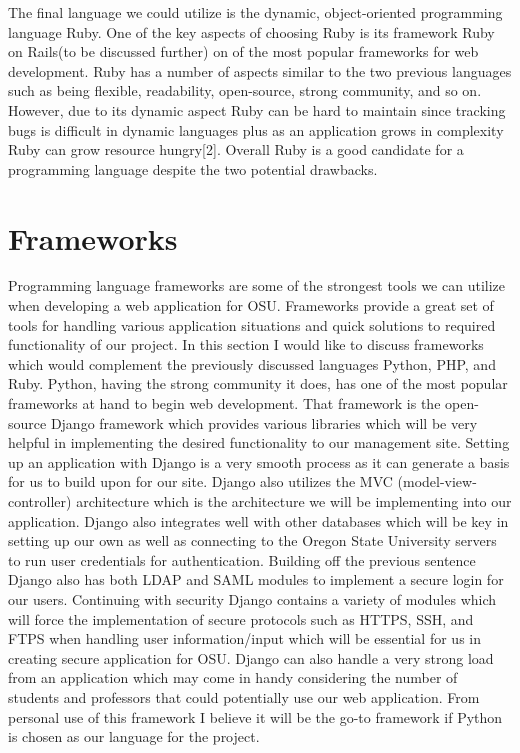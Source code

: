 \documentclass[letterpaper, 10pt, draftclsnofoot,onecolumn]{IEEEtran}
\begin{document}
The final language we could utilize is the dynamic, object-oriented programming language Ruby. One of the key aspects of choosing Ruby is its framework Ruby on Rails(to be discussed further) on of the most popular frameworks for  web development. Ruby has a number of aspects similar to the two previous languages such as being flexible, readability, open-source, strong community, and so on. However, due to its dynamic aspect Ruby can be hard to maintain since tracking bugs is difficult in dynamic languages plus as an application grows in complexity Ruby can grow resource hungry[2]. Overall Ruby is a good candidate for a programming language despite the two potential drawbacks. 

\section{Frameworks}
Programming language frameworks are some of the strongest tools we can utilize when developing a web application for OSU. Frameworks provide a great set of tools for handling various application situations and quick solutions to required functionality of our project. In this section I would like to discuss frameworks which would complement the previously discussed languages Python, PHP, and Ruby. 
Python, having the strong community it does, has one of the most popular frameworks at hand to begin web development. That framework is the open-source Django framework which provides various libraries which will be very helpful in implementing the desired functionality to our management site. Setting up an application with Django is a very smooth process as it can generate a basis for us to build upon for our site. Django also utilizes the MVC (model-view-controller) architecture which is the architecture we will be implementing into our application. Django also integrates well with other databases which will be key in setting up our own as well as connecting to the Oregon State University servers to run user credentials for authentication. Building off the previous sentence Django also has both LDAP and SAML modules to implement a secure login for our users. Continuing with security Django contains a variety of modules which will force the implementation of secure protocols such as HTTPS, SSH, and FTPS when handling user information/input which will be essential for us in creating secure application for OSU. Django can also handle a very strong load from an application which may come in handy considering the number of students and professors that could potentially use our web application. From personal use of this framework I believe it will be the go-to framework if Python is chosen as our language for the project. 
\end{document}
